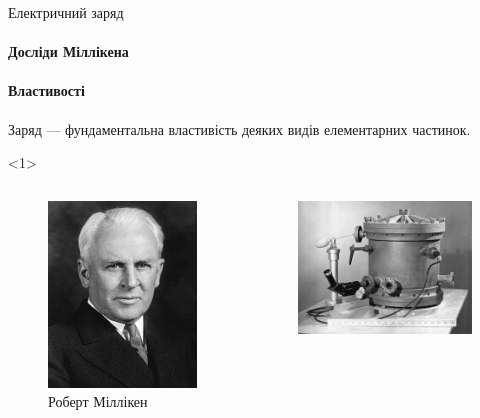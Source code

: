 \documentclass{beamer}
\begin{document}
\begin{frame}{Електричний заряд}
	\framesubtitle<1>{Досліди Міллікена}
	\framesubtitle<2>{Властивості}
	\begin{alertblock}{}\centering
		Заряд --- фундаментальна властивість деяких видів елементарних
		частинок.
	\end{alertblock}
	\begin{onlyenv}
		\begin{columns}
			\begin{column}{0.4\linewidth}
				\begin{figure}
					\includegraphics[width=0.62\linewidth]{Millikan-1920s}
					\caption{Роберт Міллікен}
				\end{figure}
			\end{column}
			\begin{column}{0.4\linewidth}
				\begin{figure}
					\includegraphics[width=1\linewidth]{Millikan-chamber}

\end{figure}
\end{column}
\end{columns}
\end{onlyenv}
\end{frame}
\end{document}
